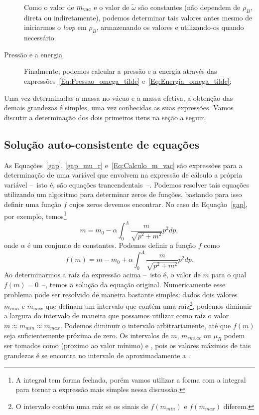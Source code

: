\begin{description}
\begin{description}
		\end{description}	
		Como o valor de $m_{\rm{vac}}$ e o valor de $\tilde\omega$ são constantes (não dependem de $\rho_B$, direta ou indiretamente), podemos determinar tais valores antes mesmo de iniciarmos o \emph{loop} em $\rho_B$, armazenando os valores e utilizando-os quando necessário.
	\item[Pressão e a energia] Finalmente, podemos calcular a pressão e a energia através das expressões~\eqref{Eq:Pressao_omega_tilde} e~\eqref{Eq:Energia_omega_tilde};
\end{description}
%
Uma vez determinadas a massa no vácuo e a massa efetiva, a obtenção das demais grandezas é simples, uma vez conhecidas as suas expressões. Vamos discutir a determinação dos dois primeiros itens na seção a seguir. 

\subsection{Solução auto-consistente de equações}

As Equações~\eqref{gap}, \eqref{gap_mu_r} e~\eqref{Eq:Calculo_m_vac} são expressões para a determinação de uma variável que envolvem na expressão de cálculo a própria variável --~isto é, são equações trancendentais~--. Podemos resolver tais equações utilizando um algoritmo para determinar zeros de funções\cite{NumericalRecipes}, bastando para isso definir uma função $f$ cujos zeros devemos encontrar. No caso da Equação~\eqref{gap}, por exemplo, temos\footnote{A integral tem forma fechada, porém vamos utilizar a forma com a integral para tornar a expressão mais simples nessa discussão.}
\begin{equation}
	m = m_0 - \alpha\int_0^\Lambda \frac{m}{\sqrt{p^2 + m^2}} p^2 dp,
\end{equation}
%
onde $\alpha$ é um conjunto de constantes. Podemos definir a função $f$ como
\begin{equation}
	f(m) = m - m_0 + \alpha\int_0^\Lambda \frac{m}{\sqrt{p^2 + m^2}} p^2 dp.
\end{equation}
%
Ao determinarmos a raíz da expressão acima --~isto é, o valor de $m$ para o qual $f(m) = 0$~--, temos a solução da equação original. Numericamente esse problema pode ser resolvido de maneira bastante simples: dados dois valores $m_{min}$ e $m_{max}$ que definam um intervalo que contém uma raíz\footnote{O intervalo contém uma raíz se os sinais de $f(m_{min})$ e $f(m_{max})$ diferem.}, podemos diminuir a largura do intervalo de maneira que possamos utilizar como raíz o valor $m \approx m_{min} \approx m_{max}$. Podemos diminuir o intervalo arbitrariamente, até que $f(m)$ seja suficientemente próxima de zero. Os intervalos de $m$, $m_{rm{vac}}$ ou $\mu_R$ podem ser tomados como  (proximo ao valor mínimo) e , pois os valores máximos de tais grandezas é se encontra no intervalo de aproximadamente  a .

